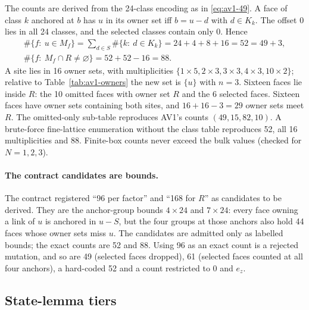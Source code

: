 The counts are derived from the 24-class encoding as in \eqref{eq:av1-49}. A
face of class $k$ anchored at $b$ has $u$ in its owner set iff $b=u-d$ with
$d\in K_k$. The offset $0$ lies in all 24 classes, and the selected classes
contain only $0$. Hence
\begin{equation}
 \begin{gathered}
 \#\{f:\ u\in M_f\}=\sum_{d\in S}\#\{k:\ d\in K_k\}=24+4+8+16=52=49+3,\\
 \#\{f:\ M_f\cap R\ne\varnothing\}=52+52-16=88 .
 \end{gathered}
 \label{eq:ax1-52}
\end{equation}
A site lies in 16 owner sets, with multiplicities
$\{1\times5,2\times3,3\times3,4\times3,10\times2\}$; relative to
Table~\ref{tab:av1-owners} the new set is $\{u\}$ with $n=3$. Sixteen faces
lie inside $R$: the 10 omitted faces with owner set $R$ and the 6 selected
faces. Sixteen faces have owner sets containing both sites, and
$16+16-3=29$ owner sets meet $R$. The omitted-only sub-table reproduces AV1's
counts $(49,15,82,10)$. A brute-force fine-lattice enumeration without the
class table reproduces 52, all 16 multiplicities and 88. Finite-box counts
never exceed the bulk values (checked for $N=1,2,3$).

\paragraph{The contract candidates are bounds.}
The contract registered ``96 per factor'' and ``168 for $R$'' as candidates
to be derived. They are the anchor-group bounds $4\times24$ and $7\times24$:
every face owning a link of $u$ is anchored in $u-S$, but the four groups at
those anchors also hold 44 faces whose owner sets miss $u$. The candidates are
admitted only as labelled bounds; the exact counts are 52 and 88. Using 96 as
an exact count is a rejected mutation, and so are 49 (selected faces dropped),
61 (selected faces counted at all four anchors), a hard-coded 52 and a count
restricted to $0$ and $e_z$.

\subsection{State-lemma tiers}
\label{sec:ax1-tiers}
